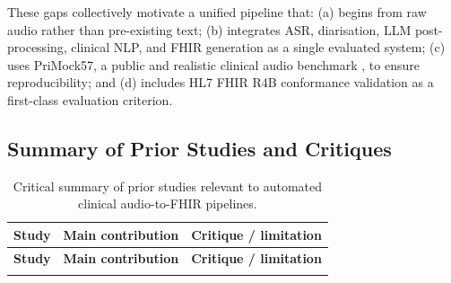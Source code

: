 These gaps collectively motivate a unified pipeline that: (a) begins from raw audio rather than pre-existing text; (b) integrates ASR, diarisation, LLM post-processing, clinical NLP, and FHIR generation as a single evaluated system; (c) uses PriMock57, a public and realistic clinical audio benchmark \cite{papadopoulos2022primock57}, to ensure reproducibility; and (d) includes HL7 FHIR R4B conformance validation as a first-class evaluation criterion.

\subsection{Summary of Prior Studies and Critiques}

\setlength{\LTleft}{0pt}
\setlength{\LTright}{0pt}
\renewcommand{\arraystretch}{1.15}
\begin{longtable}{|>{\raggedright\arraybackslash}p{}|>{\raggedright\arraybackslash}p{}|>{\raggedright\arraybackslash}p{}|}
\caption{Critical summary of prior studies relevant to automated clinical audio-to-FHIR pipelines.}
\label{tab:literature-summary}\\
\hline
\textbf{Study} & \textbf{Main contribution} & \textbf{Critique / limitation} \\
\hline
\endfirsthead

\hline
\textbf{Study} & \textbf{Main contribution} & \textbf{Critique / limitation} \\
\hline
\endhead

\hline
\endfoot

\hline
\endlastfoot


\end{longtable}
